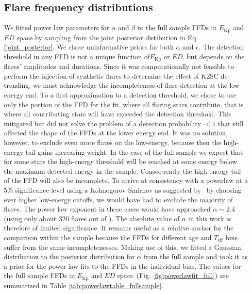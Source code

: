 \documentclass{aa}
\begin{document}
\subsection{Flare frequency distributions}
We fitted power law parameters for $\alpha$ and $\beta$ to the full sample FFDs in $E_\mathrm{Kp}$ and $ED$ space by sampling from the joint posterior distibution in Eq. \ref{joint_posterior}. We chose uninformative priors for both $\alpha$ and $\epsilon$. The detection threshold in any FFD is not a unique function of$E_\mathrm{Kp}$ or $ED$, but depends on the flares' amplitudes and durations. Since it was computationally not feasible to perform the injection of synthetic flares to determine the effect of K2SC de-trending, we must acknowledge the incompleteness of flare detection at the low energy end. To a first approximation to a detection threshold, we chose to use only the portion of the FFD for the fit, where all flaring stars contribute, that is where all contributing stars will have exceeded the detection threshold. This mitigated but did not solve the problem of a detection probability $<1$ that still affected the shape of the FFDs at the lower energy end. It was no solution, however, to exclude even more flares on the low-energy, because then the high-energy tail gains increasing weight. In the case of the full sample we expect that for some stars the high-energy threshold will be reached at some energy below the maximum detected energy in the sample. Consequently the high-energy tail of the FFD will also be incomplete. To arrive at consistency with a powerlaw at a 5\% significance level using a Kolmogorov-Smirnov as suggested by~\citet{wheatland_flaresbayes_2004} by choosing ever higher low-energy cutoffs, we would have had to exclude the majority of flares. The power law exponent in these cases would have approached $\alpha\sim 2.4$ (using only about 320 flares out of ). The absolute value of $\alpha$ in this work is therefore of limited significance. It remains useful as a relative anchor for the comparison within the sample because the FFDs for different age and $T_\mathrm{eff}$ bins suffer from the same incompletenesses. Making use of this, we fitted a Gaussian distribution to the posterior distribution for $\alpha$ from the full sample and took it as a prior for the power law fits to the FFDs in the individual bins. The values for the full sample FFDs in $E_\mathrm{Kp}$ and $ED$ space~(Fig. \ref{fig:powerlawfit_full}) are summarized in Table \ref{tab:powerlawtable_fullsample}. 
\\
\end{document}
